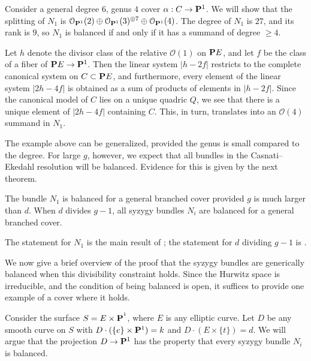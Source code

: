 \documentclass{amsart}
\renewcommand{\O}{{\mathcal O}}
\renewcommand {\P}{{\bf P}}
\numberwithin{equation}{section}
\begin{document}
\begin{example}
  \label{example:imbalance}
  Consider a general degree $6$, genus $4$ cover $\alpha: C \to \P^{1}$.
  We will show that the splitting of $N_{1}$ is $\O_{\P^{1}}(2) \oplus \O_{\P^{1}}(3)^{\oplus 7} \oplus \O_{\P^{1}}(4)$. 
  The degree of $N_{1}$ is $27$, and its rank is $9$, so $N_{1}$ is balanced if and only if it has a summand of degree $\geq 4$. 

  Let $h$ denote the divisor class of the relative $\O(1)$ on $\P E$, and let $f$ be the class of a fiber of $\P E \to \P^1$.
  Then the linear system $|h-2f|$ restricts to the complete canonical system on $C \subset \P E$, and furthermore, every element of the linear system $|2h-4f|$ is obtained as a sum of products of elements in $|h-2f|$. Since the canonical model of $C$ lies on a unique quadric $Q$, we see that there is a unique element of $|2h-4f|$ containing $C$.  This, in turn, translates into an $\O(4)$ summand in $N_{1}$. 

\end{example}

The example above can be generalized, provided the genus is small compared to the degree.
For large $g$, however, we expect that all bundles in the Casnati--Ekedahl resolution will be balanced.
Evidence for this is given by the next theorem. 

\begin{theorem}
  \label{theorem:genericF}
  The bundle $N_{1}$ is balanced for a general branched cover provided $g$ is much larger than $d$. 
  When $d$ divides $g-1$, all syzygy bundles $N_{i}$ are balanced for a general branched cover.
\end{theorem}
The statement for $N_1$ is the main result of \cite{buj.pat:15}; the statement for $d$ dividing $g-1$ is \cite[Proposition~2.4]{buj.pat:15}.

We  now give a brief overview of the proof that the syzygy bundles are generically balanced when this divisibility constraint holds.
Since the Hurwitz space is irreducible, and the condition of being balanced is open, it suffices to provide one example of a cover where it holds.

Consider the surface $S = E \times \P^{^1}$, where $E$ is any elliptic curve. Let $D$ be any smooth curve on $S$ with $D \cdot (\{e\} \times \P^1) = k$ and $D \cdot (E \times \{t\}) = d$.
We will argue that the projection $D \to \P^{1}$ has the property that every syzygy bundle $N_{i}$ is balanced.
\end{document}
